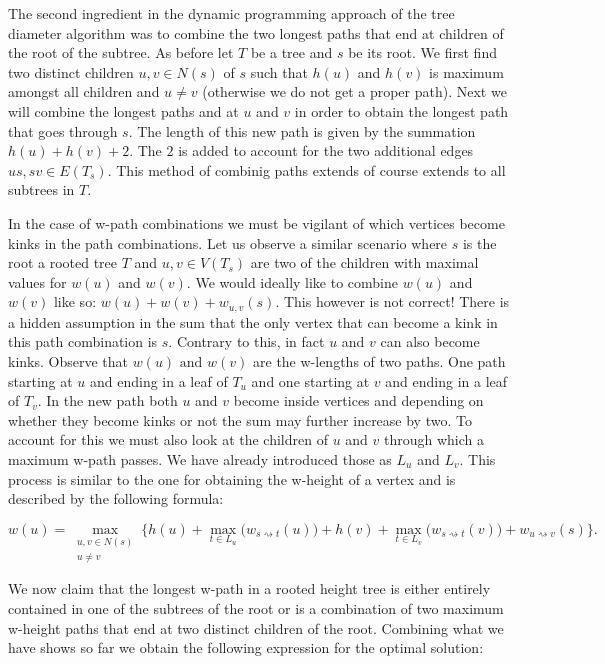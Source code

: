 The second ingredient in the dynamic programming approach of the tree diameter algorithm was to combine the two longest paths that end at children of the root of the subtree. As before let $T$ be a tree and $s$ be its root. We first find two distinct children $u, v \in N(s)$ of $s$ such that $h(u)$ and $h(v)$ is maximum amongst all children and $u \ne v$ (otherwise we do not get a proper path). Next we will combine the longest paths and at $u$ and $v$ in order to obtain the longest path that goes through $s$. The length of this new path is given by the summation $h(u) + h(v) + 2$. The $2$ is added to account for the two additional edges $us, sv \in E(T_s)$. This method of combinig paths extends of course extends to all subtrees in $T$.

In the case of w-path combinations we must be vigilant of which vertices become kinks in the path combinations. Let us observe a similar scenario where $s$ is the root a rooted tree $T$ and $u, v \in V(T_s)$ are two of the children with maximal values for $w(u)$ and $w(v)$. We would ideally like to combine $w(u)$ and $w(v)$ like so: $w(u) + w(v) + w_{u, v}(s)$. This however is not correct! There is a hidden assumption in the sum that the only vertex that can become a kink in this path combination is $s$. Contrary to this, in fact $u$ and $v$ can also become kinks. Observe that $w(u) \text{ and } w(v)$ are the w-lengths of two paths. One path starting at $u$ and ending in a leaf of $T_u$ and one starting at $v$ and ending in a leaf of $T_v$. In the new path both $u$ and $v$ become inside vertices and depending on whether they become kinks or not the sum may further increase by two. To account for this we must also look at the children of $u$ and $v$ through which a maximum w-path passes. We have already introduced those as $L_u$ and $L_v$. This process is similar to the one for obtaining the w-height of a vertex and is described by the following formula:

$$ w(u) = \max\limits_{\substack{u, v \in N(s) \\ u \ne v}}\{ h(u) + \max\limits_{t \in L_u}\Big(w_{s \rightsquigarrow t}(u)\Big) + h(v) + \max\limits_{t \in L_v}\Big(w_{s \rightsquigarrow t}(v)\Big) + w_{u \rightsquigarrow v}(s)\}. $$


We now claim that the longest w-path in a rooted height tree is either entirely contained in one of the subtrees of the root or is a combination of two maximum w-height paths that end at two distinct children of the root. Combining what we have shows so far we obtain the following expression for the optimal solution:

